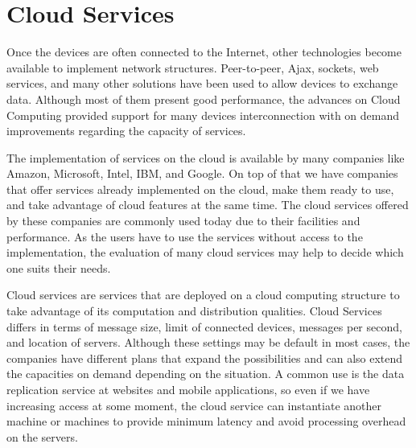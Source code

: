 





\section{Cloud Services}
\label{sec:cloudservices}

Once the devices are often connected to the Internet, other technologies become available to implement network structures.
Peer-to-peer, Ajax, sockets, web services, and many other solutions have been used to allow devices to exchange data.
Although most of them present good performance, the advances on Cloud Computing provided support for many devices interconnection with on demand improvements regarding the capacity of services.

The implementation of services on the cloud is available by many companies like Amazon, Microsoft, Intel, IBM, and Google.
On top of that we have companies that offer services already implemented on the cloud, make them ready to use, and take advantage of cloud features at the same time.
The cloud services offered by these companies are commonly used today due to their facilities and performance.
As the users have to use the services without access to the implementation, the evaluation of many cloud services may help to decide which one suits their needs.

Cloud services are services that are deployed on a cloud computing structure to take advantage of its computation and distribution qualities.
Cloud Services differs in terms of message size, limit of connected devices, messages per second, and location of servers.
Although these settings may be default in most cases, the companies have different plans that expand the possibilities and can also extend the capacities on demand depending on the situation.
A common use is the data replication service at websites and mobile applications, so even if we have increasing access at some moment, the cloud service can instantiate another machine or machines to provide minimum latency and avoid processing overhead on the servers.

